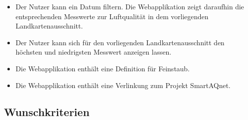 \begin{itemize}
	und den momentanen Landkartenausschnitt, den Ort oder den \glspl{Sensor} die zeitliche Entwicklung der Luftqualität als Menge-Zeit Diagramm an.
	\item Der Nutzer kann ein Datum filtern. 
	Die Webapplikation zeigt daraufhin die entsprechenden Messwerte zur Luftqualität in dem vorliegenden Landkartenausschnitt.
	\item Der Nutzer kann sich für den vorliegenden Landkartenausschnitt den höchsten und niedrigsten Messwert anzeigen lassen.
	\item Die Webapplikation enthält eine Definition für Feinstaub.
	\item Die Webapplikation enthält eine Verlinkung zum Projekt SmartAQnet. 
\end{itemize}
\subsection{Wunschkriterien}
